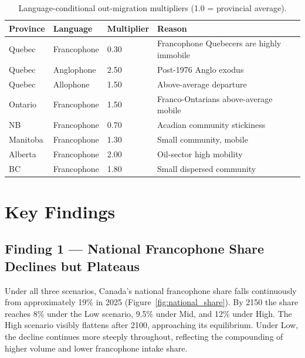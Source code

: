 \documentclass[11pt,a4paper]{article}
\begin{document}
\begin{table}[H]
\centering
\caption{Language-conditional out-migration multipliers (1.0 = provincial average).}
\label{tab:lang_mult}
\vspace{4pt}
\begin{tabular}{L{2.5cm} L{2.5cm} C{2.5cm} L{5cm}}
\toprule
\textbf{Province} & \textbf{Language} & \textbf{Multiplier} & \textbf{Reason} \\
\midrule
Quebec & Francophone & 0.30 & Francophone Quebecers are highly immobile \\
Quebec & Anglophone  & 2.50 & Post-1976 Anglo exodus \\
Quebec & Allophone   & 1.50 & Above-average departure \\
Ontario & Francophone & 1.50 & Franco-Ontarians above-average mobile \\
NB      & Francophone & 0.70 & Acadian community stickiness \\
Manitoba & Francophone & 1.30 & Small community, mobile \\
Alberta  & Francophone & 2.00 & Oil-sector high mobility \\
BC       & Francophone & 1.80 & Small dispersed community \\
\bottomrule
\end{tabular}
\end{table}


\section{Key Findings}

\subsection{Finding 1 --- National Francophone Share Declines but Plateaus}

Under all three scenarios, Canada's national francophone share falls
continuously from approximately 19\% in 2025 (Figure~\ref{fig:national_share}).
By 2150 the share reaches 8\% under the Low scenario, 9.5\% under Mid, and
12\% under High.  The High scenario visibly flattens after 2100, approaching
its equilibrium.  Under Low, the decline continues more steeply throughout,
reflecting the compounding of higher volume and lower francophone intake share.
\end{document}
